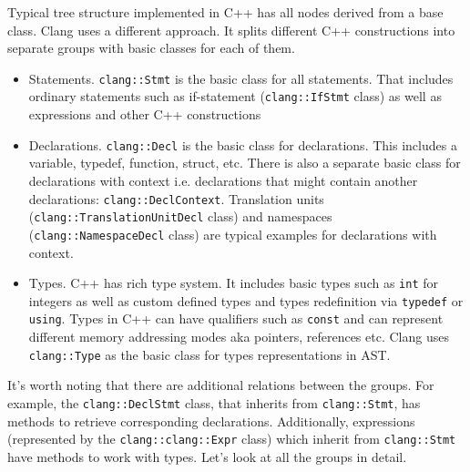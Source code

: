 Typical tree structure implemented in C++ has all nodes derived from a base
class. Clang uses a different approach. It splits different C++ constructions
into separate groups with basic classes for each of them.
\begin{itemize}
  \item Statements. \texttt{clang::Stmt} is the basic class for all
    statements. That includes 
    ordinary statements such as if-statement (\texttt{clang::IfStmt}
    class) as well as expressions and other C++ constructions
  \item Declarations. \texttt{clang::Decl} is the basic class for
    declarations. This includes a variable, typedef, function, struct,
    etc. There is also a separate basic class for declarations with context
    i.e. declarations that might contain another declarations:
    \texttt{clang::DeclContext}. Translation units
    (\texttt{clang::TranslationUnitDecl} class) and namespaces
    (\texttt{clang::NamespaceDecl} class) are typical examples for
    declarations with 
    context.  
  \item Types. C++ has rich type system. It includes basic types such as
    \texttt{int} for integers as well as custom defined types and types
    redefinition via \texttt{typedef} or \texttt{using}. Types
    in C++ can have qualifiers such as \texttt{const} and can represent
    different memory addressing modes aka pointers, references etc. Clang uses
    \texttt{clang::Type} as the basic class for types representations
    in AST. 
\end{itemize}
It's worth noting that there are additional relations between the groups. For
example, the \texttt{clang::DeclStmt} class, that inherits from
\texttt{clang::Stmt}, has methods to retrieve corresponding
declarations. Additionally, expressions (represented by the
\texttt{clang::clang::Expr} class) which inherit from
\texttt{clang::Stmt} have methods to work with types. Let's look at all
the groups in detail. 


